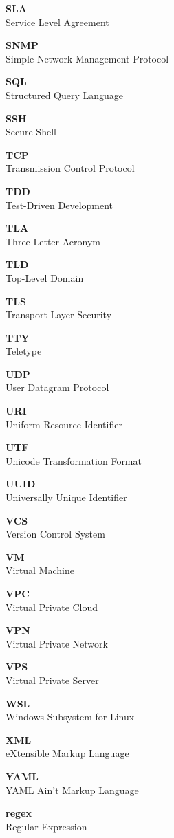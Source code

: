 \documentclass[a4paper]{article}
\newcommand{\AcronymRow}[2]{%
  \vfill
  \begin{center}
    {\fontsize{60}{72}\selectfont \textbf{#1}} \\[0.5em]
    {\Large #2}
  \end{center}
}
\begin{document}
\AcronymRow{SLA}{Service Level Agreement}
\AcronymRow{SNMP}{Simple Network Management Protocol}
\AcronymRow{SQL}{Structured Query Language}
\AcronymRow{SSH}{Secure Shell}
\AcronymRow{TCP}{Transmission Control Protocol}
\AcronymRow{TDD}{Test-Driven Development}
\AcronymRow{TLA}{Three-Letter Acronym}
\AcronymRow{TLD}{Top-Level Domain}
\AcronymRow{TLS}{Transport Layer Security}
\AcronymRow{TTY}{Teletype}
\AcronymRow{UDP}{User Datagram Protocol}
\AcronymRow{URI}{Uniform Resource Identifier}
\AcronymRow{UTF}{Unicode Transformation Format}
\AcronymRow{UUID}{Universally Unique Identifier}
\AcronymRow{VCS}{Version Control System}
\AcronymRow{VM}{Virtual Machine}
\AcronymRow{VPC}{Virtual Private Cloud}
\AcronymRow{VPN}{Virtual Private Network}
\AcronymRow{VPS}{Virtual Private Server}
\AcronymRow{WSL}{Windows Subsystem for Linux}
\AcronymRow{XML}{eXtensible Markup Language}
\AcronymRow{YAML}{YAML Ain't Markup Language}
\AcronymRow{regex}{Regular Expression}
\end{document}
